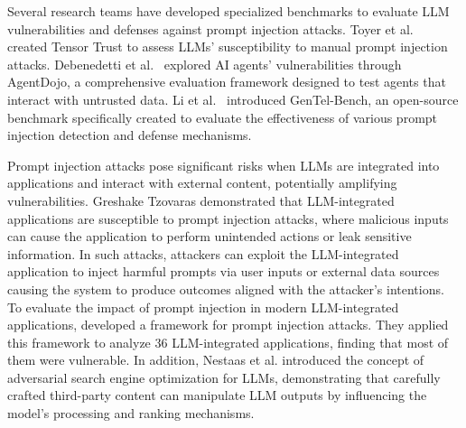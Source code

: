 Several research teams have developed specialized benchmarks to evaluate LLM vulnerabilities and defenses against prompt injection attacks. 
Toyer et al.~\cite{toyer2023tensor} created Tensor Trust to assess LLMs' susceptibility to manual prompt injection attacks. Debenedetti et al.~\cite{debenedetti2024agentdojo} explored AI agents' vulnerabilities through AgentDojo, a comprehensive evaluation framework designed to test agents that interact with untrusted data. 
Li et al.~\cite{li2024gentel} introduced GenTel-Bench, an open-source benchmark specifically created to evaluate the effectiveness of various prompt injection detection and defense mechanisms.


Prompt injection attacks pose significant risks when LLMs are integrated into applications and interact with external content, potentially amplifying vulnerabilities\cite{greshake2023youvesignedforcompromising,liu2023prompt,nestaas2024adversarial}.
 Greshake Tzovaras \cite{greshake2023youvesignedforcompromising} demonstrated that LLM-integrated applications are susceptible to prompt injection attacks, where malicious inputs can cause the application to perform unintended actions or leak sensitive information.  In such attacks, attackers can exploit the LLM-integrated application to inject harmful prompts via user inputs or external data sources causing the system to produce outcomes aligned with the attacker's intentions.
To evaluate the impact of prompt injection in modern LLM-integrated applications, \cite{liu2023prompt} developed a framework for prompt injection attacks. They applied this framework to analyze 36 LLM-integrated applications, finding that most of them were vulnerable. In addition, Nestaas et al. \cite{nestaas2024adversarial} introduced the concept of adversarial search engine optimization for LLMs, demonstrating that carefully crafted third-party content can manipulate LLM outputs by influencing the model’s processing and ranking mechanisms.



